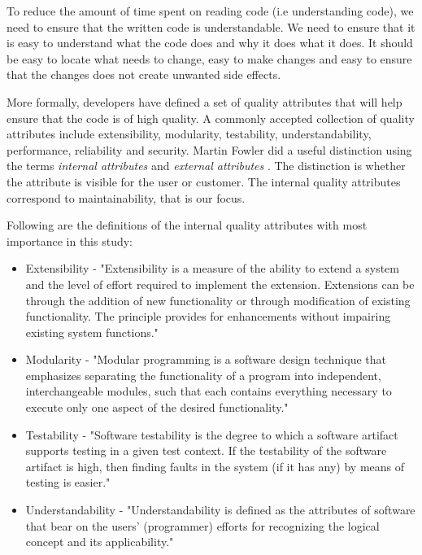 \documentclass{report}
\begin{document}
To reduce the amount of time spent on reading code (i.e understanding code), we need to ensure that the written code is understandable. We need to ensure that it is easy to understand what the code does and why it does what it does. It should be easy to locate what needs to change, easy to make changes and easy to ensure that the changes does not create unwanted side effects. \hfill 
\hfill \newline

More formally, developers have defined a set of quality attributes that will help ensure that the code is of high quality. A commonly accepted collection of quality attributes include extensibility, modularity, testability, understandability, performance, reliability and security. Martin Fowler did a useful distinction using the terms \textit{internal attributes} and \textit{external attributes} \cite{internalExternal}. The distinction is whether the attribute is visible for the user or customer. The internal quality attributes correspond to maintainability, that is our focus. 

Following are the definitions of the internal quality attributes with most importance in this study:
\begin{itemize}
	\item Extensibility - "Extensibility is a measure of the ability to extend a system and the level of effort required to implement the extension. Extensions can be through the addition of new functionality or through modification of existing functionality. The principle provides for enhancements without impairing existing system functions." \cite{Extensib83:online}
    	\item Modularity - "Modular programming is a software design technique that emphasizes separating the functionality of a program into independent, interchangeable modules, such that each contains everything necessary to execute only one aspect of the desired functionality." \cite{Modularp60:online}
	\item Testability - "Software testability is the degree to which a software artifact supports testing in a given test context. If the testability of the software artifact is high, then finding faults in the system (if it has any) by means of testing is easier." \cite{Software40:online}
	\item Understandability - "Understandability is defined as the attributes of software that bear on the users' (programmer) efforts for recognizing the logical concept and its applicability." \cite{Understa26:online}
\end{itemize}
\end{document}
